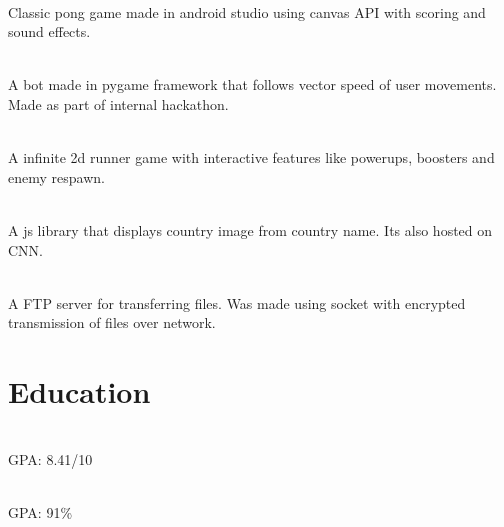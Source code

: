 \documentclass[]{deedy-resume-openfont}
\begin{document}
\hfill {}\\
Classic pong game made in android studio using canvas API with scoring and sound effects.\\
\sectionsep
  

\hfill {}\\
A bot made in pygame framework that follows vector speed of user movements. Made as part of internal hackathon.\\
\sectionsep
  

\hfill {}\\
A infinite 2d runner game with interactive features like powerups, boosters and enemy respawn.\\
\sectionsep
  

\hfill {}\\
A js library that displays country image from country name. Its also hosted on CNN.\\
\sectionsep
  

\hfill {}\\
A FTP server for transferring files. Was made using socket with encrypted transmission of files over network.\\
\sectionsep
%
%
\section{Education}
\raggedright

\hfill {}\\
GPA: 8.41/10\\
\sectionsep
  

\hfill {}\\
GPA: 91\%\\
\sectionsep
  
\end{document}
